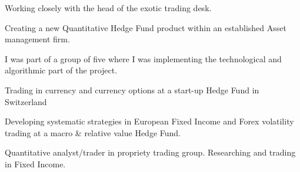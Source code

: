 Working closely with the head of the exotic trading desk.


Creating a new Quantitative Hedge Fund product within an established Asset management firm.

I was part of a group of five where I was implementing the technological and algorithmic part of the project.


Trading in currency and currency options at a start-up Hedge Fund in Switzerland


Developing systematic strategies in European Fixed Income and Forex volatility trading at a macro \& relative value Hedge Fund.


Quantitative analyst/trader in propriety trading group. Researching and trading in Fixed Income.
